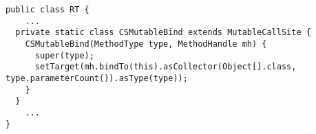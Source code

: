 {\tiny \begin{verbatim}
public class RT {
    ...
  private static class CSMutableBind extends MutableCallSite {
    CSMutableBind(MethodType type, MethodHandle mh) {
      super(type);
      setTarget(mh.bindTo(this).asCollector(Object[].class, type.parameterCount()).asType(type));
    }
  }
    ...
}
\end{verbatim} }